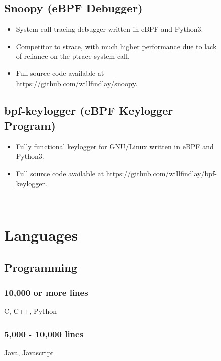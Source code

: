 \documentclass[
]{article}
\theoremstyle{plain}
\theoremstyle{remark}
\theoremstyle{definition}
\begin{document}
\begin{figure}
\begin{minipage}[t]{0.65\textwidth}
\subsection{Snoopy (eBPF Debugger)}
\begin{itemize}[itemsep=0em]
\item System call tracing debugger written in eBPF and Python3.
\item Competitor to strace, with much higher performance due to lack of reliance on the ptrace system call.
\item Full source code available at \url{https://github.com/willfindlay/snoopy}.
\end{itemize}

\subsection{bpf-keylogger (eBPF Keylogger Program)}
\begin{itemize}[itemsep=0em]
\item Fully functional keylogger for GNU/Linux written in eBPF and Python3.
\item Full source code available at \url{https://github.com/willfindlay/bpf-keylogger}.
\end{itemize}

\end{minipage}
\hfill
\begin{minipage}[t]{0.32\textwidth}
\color{gray}
\ %
\vspace{-1.5em}

\section{Languages}

\subsection{Programming}

\subsubsection{10,000 or more lines}

C, C++, Python

\subsubsection{5,000 - 10,000 lines}

Java, Javascript


\end{minipage}
\end{figure}
\end{document}

